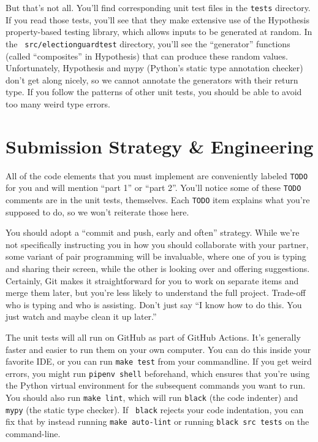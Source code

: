 \documentclass[letterpaper,12pt]{article}
\begin{document}
But that's not all. You'll find corresponding unit test files in the
{\tt tests} directory. If you read those tests, you'll see that they
make extensive use of the Hypothesis property-based testing library,
which allows inputs to be generated at random. In the {\tt
  src/electionguardtest}
directory, you'll see the ``generator'' functions (called
``composites'' in Hypothesis) that can produce these random values.
Unfortunately, Hypothesis and mypy (Python's static type annotation
checker) don't get along nicely, so we cannot annotate the generators
with their return type. If you follow the patterns of other unit
tests, you should be able to avoid too many weird type errors.


\newpage
\section{Submission Strategy \& Engineering}

All of the code elements that you must implement are conveniently
labeled {\tt TODO} for you and will mention ``part 1'' or ``part 2''.
You'll notice some of these {\tt TODO} comments are in the unit tests,
themselves. Each {\tt TODO} item explains what you're supposed to do,
so we won't reiterate those here.

You should adopt a ``commit and push, early and often'' strategy.
While we're not specifically instructing you in how you should
collaborate with your partner, some variant of pair programming will
be invaluable, where one of you is typing and sharing their screen,
while the other is looking over and offering suggestions. Certainly,
Git makes it straightforward for you to work on separate items and
merge them later, but you're less likely to understand the full
project. Trade-off who is typing and who is assisting. Don't just say
``I know how to do this. You just watch and maybe clean it up later.''

The unit tests will all run on GitHub as part of GitHub Actions. It's
generally faster and easier to run them on your own computer. You can
do this inside your favorite IDE, or you can run {\tt make test} from
your commandline. If you get weird errors, you might run {\tt pipenv
  shell} beforehand, which ensures that you're using the Python
virtual environment for the subsequent commands you want to run.
You should also run {\tt make lint}, which will run {\tt black} (the
code indenter) and {\tt mypy} (the static type checker). If {\tt
  black} rejects your code indentation, you can fix that by instead
running {\tt make auto-lint} or running {\tt black src tests} on the
command-line.
\end{document}
